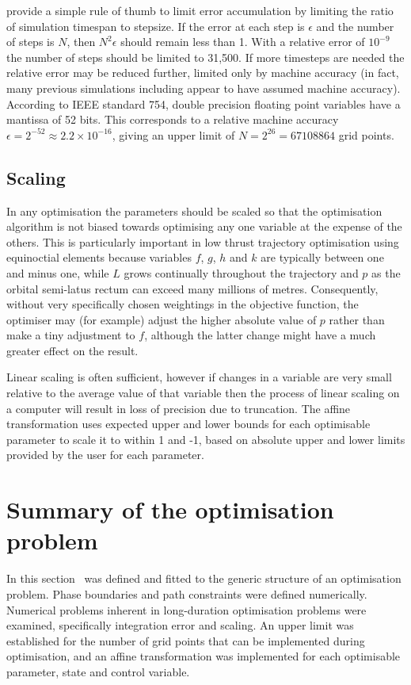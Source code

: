 \textcite{Milani1987} provide a simple rule of thumb to limit error accumulation by limiting the ratio of simulation timespan to stepsize. If the error at each step is $\epsilon$ and the number of steps is $N$, then $N^{2}\epsilon$ should remain less than 1. With a relative error of $10^{-9}$ the number of steps should be limited to 31,500. If more timesteps are needed the relative error may be reduced further, limited only by machine accuracy (in fact, many previous simulations including \citeauthor{Milani1987} appear to have assumed machine accuracy). According to IEEE standard 754, double precision floating point variables have a mantissa of 52 bits. This corresponds to a relative machine accuracy $\epsilon=2^{-52}\approx2.2\times10^{-16}$, giving an upper limit of $N=2^26=67108864$ grid points.

\subsection{Scaling} \label{sub:Scaling}

In any optimisation the parameters should be scaled so that the optimisation algorithm is not biased towards optimising any one variable at the expense of the others. This is particularly important in low thrust trajectory optimisation using equinoctial elements because variables $f$, $g$, $h$ and $k$ are typically between one and minus one, while $L$ grows continually throughout the trajectory and $p$ as the orbital semi-latus rectum can exceed many millions of metres. Consequently, without very specifically chosen weightings in the objective function, the optimiser may (for example) adjust the higher absolute value of $p$ rather than make a tiny adjustment to $f$, although the latter change might have a much greater effect on the result.

Linear scaling is often sufficient, however if changes in a variable are very small relative to the average value of that variable then the process of linear scaling on a computer will result in loss of precision due to truncation. The affine transformation \parencite{ASTOS_guide} uses expected upper and lower bounds for each optimisable parameter to scale it to within 1 and -1, based on absolute upper and lower limits provided by the user for each parameter.

\section{Summary of the optimisation problem} \label{sec:Optimisation-Summary}

In this section \BW\ was defined and fitted to the generic structure of an optimisation problem. Phase boundaries and path constraints were defined numerically. Numerical problems inherent in long-duration optimisation problems were examined, specifically integration error and scaling. An upper limit was established for the number of grid points that can be implemented during optimisation, and an affine transformation was implemented for each optimisable parameter, state and control variable. 
 
\clearpage